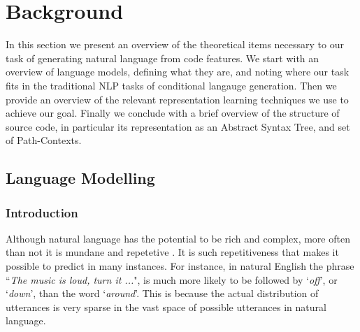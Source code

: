 \chapter{Background}
\label{background}

In this section we present an overview of the theoretical items necessary to our task of generating natural language from code features.
We start with an overview of language models, defining what they are, and noting where our task fits in the traditional NLP tasks of conditional langauge generation.
Then we provide an overview of the relevant representation learning techniques we use to achieve our goal.
Finally we conclude with a brief overview of the structure of source code, in particular its representation as an Abstract Syntax Tree, and set of Path-Contexts. 


\section{Language Modelling} %
\label{sec:lstm}

\subsection{Introduction} %
\label{sub:recurrent_neural_networks}

Although natural language has the potential to be rich and complex, more often than not it is mundane and repetetive \citep{c._e._shannon_prediction_1951}. 
It is such repetitiveness that makes it possible to predict in many instances. For instance, in natural English the phrase ``\textit{The music is loud, turn it ...}", is much more likely to be followed by `\textit{off}', or `\textit{down}', than the word `\textit{around}'.
This is because the actual distribution of utterances is very sparse in  the vast space of possible utterances in natural language.

